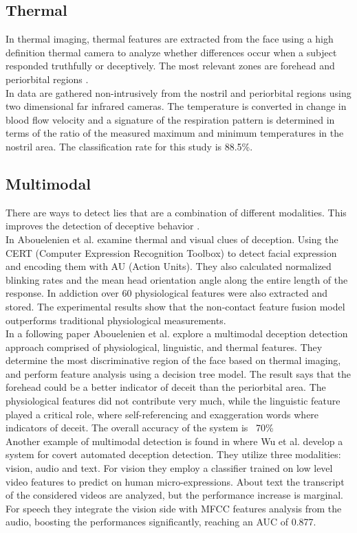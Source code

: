 \documentclass[LaM,binding=0.6cm,english,noexaminfo]{sapthesis}
\begin{document}
\subsection*{Thermal}
In thermal imaging, thermal features are extracted from the face using a high definition thermal camera to analyze whether differences occur when a subject responded truthfully or deceptively. The most relevant zones are forehead and periorbital regions \cite{Rajoub} \cite{Abouelenien:2015:TAD:2823465.2823470}. \\
In \cite{6967765} data are gathered non-intrusively from the nostril and periorbital regions using two dimensional far infrared cameras. The temperature is converted in change in blood flow velocity and a signature of the respiration pattern is determined in terms of the ratio of the measured maximum and minimum temperatures in the nostril area. The classification rate for this study is 88.5\%.

\subsection*{Multimodal}
There are ways to detect lies that are a combination of different modalities. This improves the detection of deceptive behavior \cite{Abouelenien:2014:DDU:2663204.2663229}. \\
In \cite{Abouelenien:2016:ATV:2910674.2910682} Abouelenien et al. examine thermal and visual clues of deception. Using the CERT (Computer Expression Recognition Toolbox) to detect facial expression and encoding them with AU (Action Units). They also calculated normalized blinking rates and the mean head orientation angle along the entire length of the response. In addiction over 60 physiological features were also extracted and stored. The experimental results show that the non-contact feature fusion model outperforms traditional physiological measurements.\\
In a following paper \cite{7782429} Abouelenien et al. explore a multimodal deception detection approach comprised of physiological, linguistic, and thermal features. They determine the most discriminative region of the face based on thermal imaging, and perform feature analysis using a decision tree model. The result says that the forehead could be a better indicator of deceit than the periorbital area. The physiological features did not contribute very much, while the linguistic feature played a critical role, where self-referencing and exaggeration words where indicators of deceit. The overall accuracy of the system is ~70\%\\
Another example of multimodal detection is found in \cite{DBLP:journals/corr/abs-1712-04415} where Wu et al. develop a system for covert automated deception detection. They utilize three modalities: vision, audio and text. For vision they employ a classifier trained on low level video features to predict on human micro-expressions. About text the transcript of the considered videos are analyzed, but the performance increase is marginal. For speech they integrate the vision side with MFCC features analysis from the audio, boosting the performances significantly, reaching an AUC of 0.877. \\
\end{document}
